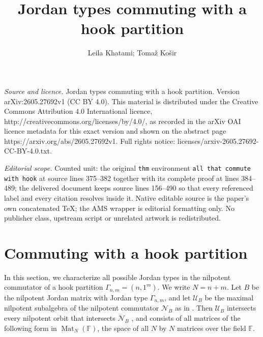 \documentclass[10pt,a4paper]{amsart}
\newcommand{\U}{\mathcal{U}}
\newcommand{\Nil}{\mathcal{N}}
\begin{document}
\title[Jordan types commuting with a hook partition]{Jordan types commuting with a hook partition}
\author{Leila Khatami; Tomaž Košir}
\date{}
\maketitle
\noindent\emph{Source and licence.} Jordan types commuting with a hook partition. Version arXiv:2605.27692v1 (CC BY 4.0). This material is distributed under the Creative Commons Attribution 4.0 International licence, http://creativecommons.org/licenses/by/4.0/, as recorded in the arXiv OAI licence metadata for this exact version and shown on the abstract page https://arxiv.org/abs/2605.27692v1. Full rights notice: licenses/arxiv-2605.27692-CC-BY-4.0.txt.\par\smallskip
\noindent\textit{Editorial scope.} Counted unit: the original \texttt{thm} environment \texttt{all that commute with hook} at source lines 375--382 together with its complete proof at lines 384--489; the delivered document keeps source lines 156--490 so that every referenced label and every citation resolves inside it. Native editable source is the paper's own concatenated TeX; the AMS wrapper is editorial formatting only. No publisher class, upstream script or unrelated artwork is redistributed.
\section{Commuting with a hook partition}\label{hook}



In this section, we characterize all possible Jordan types in the nilpotent commutator of a hook partition $\Gamma_{n,m}=(n,1^m)$. We write $N=n+m$. Let $B$ be the nilpotent Jordan matrix with Jordan type $\Gamma_{n,m}$, and let $\U_{B}$ be the maximal nilpotent subalgebra of the nilpotent commutator $\Nil_B$ as in \cite{BaIK2010}. Then $\U_B$ intersects every nilpotent orbit that intersects $\Nil_B$ \cite[Lem. 2.2]{BaIK2010}, and consists of all matrices of the following form in $\operatorname{Mat}_{N}(\mathbb{F})$, the space of all $N$ by  $N$ matrices over the field $\mathbb{F}$.
\end{document}
